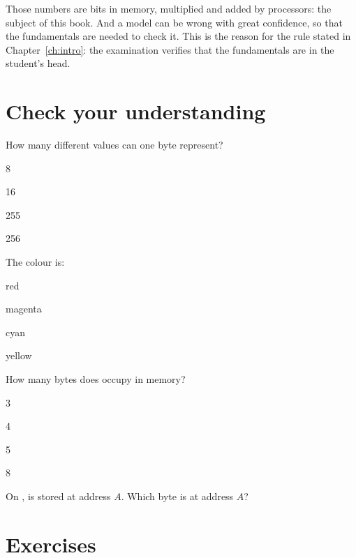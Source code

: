 Those numbers are bits in memory, multiplied and added by processors: the
subject of this book. And a model can be wrong with great confidence, so that
the fundamentals are needed to check it. This is the reason for the rule
stated in Chapter~\ref{ch:intro}: the examination verifies that the
fundamentals are in the student's head.





\section{Check your understanding}

\begin{quiz}{How many different values can one byte represent?}
\item 8
\item 16
\item 255
\item 256
\end{quiz}

\begin{quiz}{The \prg colour  is:}
\item red
\item magenta
\item cyan
\item yellow
\end{quiz}

\begin{quiz}{How many bytes does  occupy in memory?}
\item 3
\item 4
\item 5
\item 8
\end{quiz}

\begin{quiz}{On \riscv,  is stored at address $A$. Which byte is at address $A$?}
\item {}
\item {}
\item {}
\item {}
\end{quiz}

\section{Exercises}

